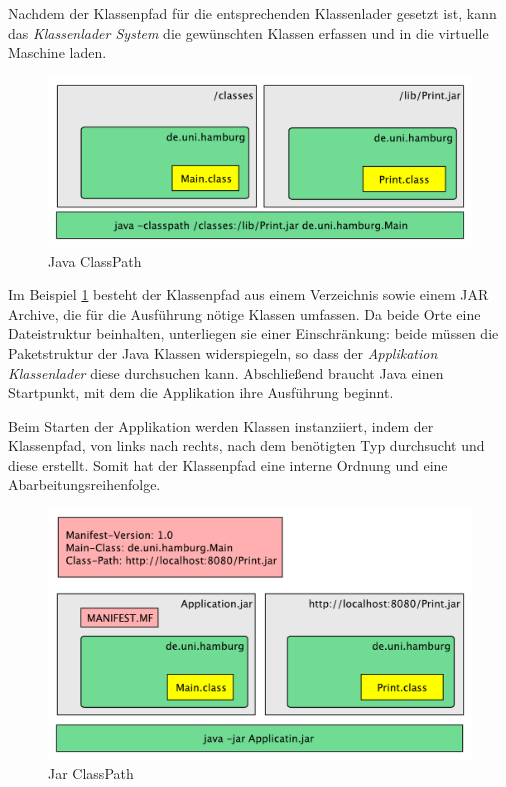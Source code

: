   Nachdem der Klassenpfad für die entsprechenden Klassenlader gesetzt ist, kann das \textit{Klassenlader System} die gewünschten Klassen erfassen und in die virtuelle Maschine laden.

  \begin{figure}[h]
    \includegraphics[width=\textwidth]{material/images/Classpath2.pdf}
    \caption{Java ClassPath}
    \label{fig:cps}
  \end{figure}

  Im Beispiel \ref{fig:cps} besteht der Klassenpfad aus einem Verzeichnis sowie einem JAR Archive, die für die Ausführung nötige Klassen umfassen. Da beide Orte eine Dateistruktur beinhalten, unterliegen sie einer Einschränkung: beide müssen die Paketstruktur der Java Klassen widerspiegeln, so dass der \textit{Applikation Klassenlader} diese durchsuchen kann. Abschließend braucht Java einen Startpunkt, mit dem die Applikation ihre Ausführung beginnt. 

  Beim Starten der Applikation werden Klassen instanziiert, indem der Klassenpfad, von links nach rechts, nach dem benötigten Typ durchsucht und diese erstellt. Somit hat der Klassenpfad eine interne Ordnung und eine Abarbeitungsreihenfolge. 

  \begin{figure}[h]
    \includegraphics[width=\textwidth]{material/images/Classpath-Manifest2.pdf}
    \caption{Jar ClassPath}
    \label{fig:cpa}
  \end{figure}

